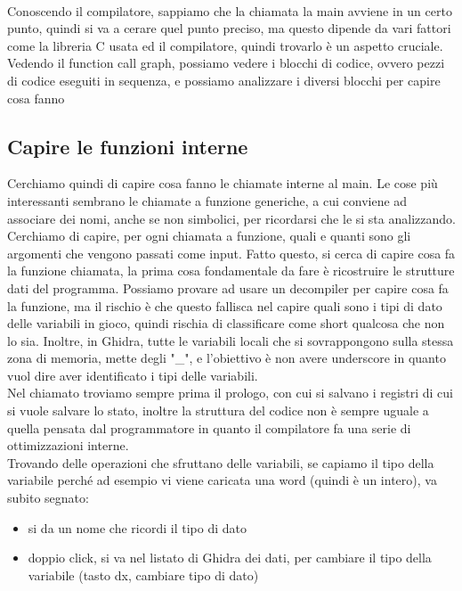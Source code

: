 \documentclass[12pt, oneside]{extbook}
\begin{document}
\\ Conoscendo il compilatore, sappiamo che la chiamata la main avviene in un certo punto, quindi si va a cerare quel punto preciso, ma questo dipende da vari fattori come la libreria C usata ed il compilatore, quindi trovarlo è un aspetto cruciale.\\ Vedendo il function call graph, possiamo vedere i blocchi di codice, ovvero pezzi di codice eseguiti in sequenza, e possiamo analizzare i diversi blocchi per capire cosa fanno
\subsection{Capire le funzioni interne}
Cerchiamo quindi di capire cosa fanno le chiamate interne al main. Le cose più interessanti sembrano le chiamate a funzione generiche, a cui conviene ad associare dei nomi, anche se non simbolici, per ricordarsi che le si sta analizzando. Cerchiamo di capire, per ogni chiamata a funzione, quali e quanti sono gli argomenti che vengono passati come input. Fatto questo, si cerca di capire cosa fa la funzione chiamata, la prima cosa fondamentale da fare è ricostruire le strutture dati del programma. Possiamo provare ad usare un decompiler per capire cosa fa la funzione, ma il rischio è che questo fallisca nel capire quali sono i tipi di dato delle variabili in gioco, quindi rischia di classificare come short qualcosa che non lo sia. Inoltre, in Ghidra, tutte le variabili locali che si sovrappongono sulla stessa zona di memoria, mette degli "\_", e l'obiettivo è non avere underscore in quanto vuol dire aver identificato i tipi delle variabili.\\ Nel chiamato troviamo sempre prima il prologo, con cui si salvano i registri di cui si vuole salvare lo stato, inoltre la struttura del codice non è sempre uguale a quella pensata dal programmatore in quanto il compilatore fa una serie di ottimizzazioni interne. \\ Trovando delle operazioni che sfruttano delle variabili, se capiamo il tipo della variabile perché ad esempio vi viene caricata una word (quindi è un intero), va subito segnato:
\begin{itemize}
\item si da un nome che ricordi il tipo di dato
\item doppio click, si va nel listato di Ghidra dei dati, per cambiare il tipo della variabile (tasto dx, cambiare tipo di dato)
\end{itemize}
\end{document}
